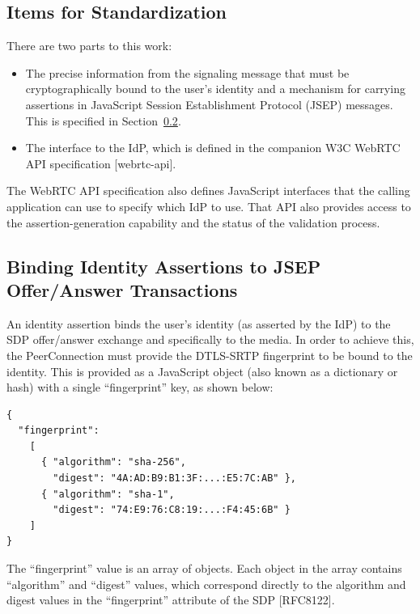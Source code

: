 \documentclass{article}
\begin{document}
\subsection{Items for Standardization}

There are two parts to this work:

\begin{itemize}
\item The precise information from the signaling message that must be
  cryptographically bound to the user's identity and a mechanism for
  carrying assertions in JavaScript Session Establishment Protocol
  (JSEP) messages.  This is specified in Section~\ref{sec:binding-identity}.

\item The interface to the IdP, which is defined in the companion W3C
  WebRTC API specification [webrtc-api].
\end{itemize}

The WebRTC API specification also defines JavaScript interfaces that
the calling application can use to specify which IdP to use.  That
API also provides access to the assertion-generation capability and
the status of the validation process.

\subsection{Binding Identity Assertions to JSEP Offer/Answer Transactions}
\label{sec:binding-identity}

An identity assertion binds the user's identity (as asserted by the
IdP) to the SDP offer/answer exchange and specifically to the media.
In order to achieve this, the PeerConnection must provide the DTLS-SRTP fingerprint to be bound to the identity.  This is provided as a
JavaScript object (also known as a dictionary or hash) with a single
``fingerprint'' key, as shown below:

\begin{verbatim}
{
  "fingerprint":
    [
      { "algorithm": "sha-256",
        "digest": "4A:AD:B9:B1:3F:...:E5:7C:AB" },
      { "algorithm": "sha-1",
        "digest": "74:E9:76:C8:19:...:F4:45:6B" }
    ]
}
\end{verbatim}

The ``fingerprint'' value is an array of objects.  Each object in the
array contains ``algorithm'' and ``digest'' values, which correspond
directly to the algorithm and digest values in the ``fingerprint''
attribute of the SDP [RFC8122].
\end{document}
